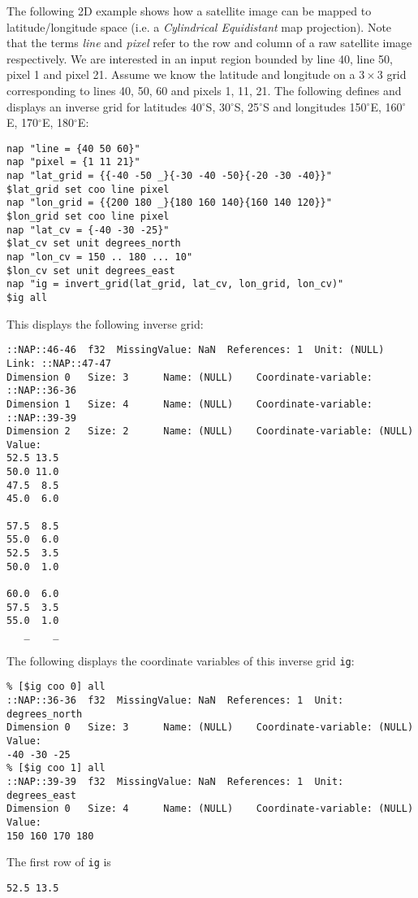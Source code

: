 The following 2D example shows how a satellite image can be mapped
  to latitude/longitude space (i.e. a 
  \textit{Cylindrical Equidistant} map projection). Note that the terms
  \textit{line} and 
  \textit{pixel} refer to the row and column of a raw satellite image
  respectively. We are interested in an input region bounded by line
  40, line 50, pixel 1 and pixel 21. Assume we know the latitude and
  longitude on a $3\times 3$ grid corresponding to lines 40, 50, 60 and pixels
  1, 11, 21. The following defines and displays an inverse grid for
  latitudes 40$^{\circ}$S, 30$^{\circ}$S, 25$^{\circ}$S and longitudes 150$^{\circ}$E, 160$^{\circ}$E, 170$^{\circ}$E,
  180$^{\circ}$E:
  \begin{verbatim}
nap "line = {40 50 60}"
nap "pixel = {1 11 21}"
nap "lat_grid = {{-40 -50 _}{-30 -40 -50}{-20 -30 -40}}"
$lat_grid set coo line pixel
nap "lon_grid = {{200 180 _}{180 160 140}{160 140 120}}"
$lon_grid set coo line pixel
nap "lat_cv = {-40 -30 -25}"
$lat_cv set unit degrees_north
nap "lon_cv = 150 .. 180 ... 10"
$lon_cv set unit degrees_east
nap "ig = invert_grid(lat_grid, lat_cv, lon_grid, lon_cv)"
$ig all
\end{verbatim}

This displays the following inverse grid:
  \begin{verbatim}
::NAP::46-46  f32  MissingValue: NaN  References: 1  Unit: (NULL)
Link: ::NAP::47-47
Dimension 0   Size: 3      Name: (NULL)    Coordinate-variable: ::NAP::36-36
Dimension 1   Size: 4      Name: (NULL)    Coordinate-variable: ::NAP::39-39
Dimension 2   Size: 2      Name: (NULL)    Coordinate-variable: (NULL)
Value:
52.5 13.5
50.0 11.0
47.5  8.5
45.0  6.0

57.5  8.5
55.0  6.0
52.5  3.5
50.0  1.0

60.0  6.0
57.5  3.5
55.0  1.0
   _    _
\end{verbatim}

The following displays the coordinate variables of this inverse
grid 
  \texttt{ig}:
  \begin{verbatim}
% [$ig coo 0] all
::NAP::36-36  f32  MissingValue: NaN  References: 1  Unit: degrees_north
Dimension 0   Size: 3      Name: (NULL)    Coordinate-variable: (NULL)
Value:
-40 -30 -25
% [$ig coo 1] all
::NAP::39-39  f32  MissingValue: NaN  References: 1  Unit: degrees_east
Dimension 0   Size: 4      Name: (NULL)    Coordinate-variable: (NULL)
Value:
150 160 170 180
\end{verbatim}

The first row of 
  \texttt{ig} is
  \begin{verbatim}
52.5 13.5
\end{verbatim}

